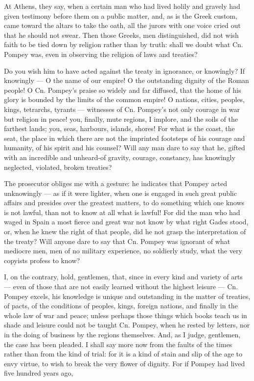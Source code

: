  At Athens, they say, when a certain man who had lived holily and gravely had given testimony before them on a public matter, and, as is the Greek custom, came toward the altars to take the oath, all the jurors with one voice cried out that he should not swear. Then those Greeks, men distinguished, did not wish faith to be tied down by religion rather than by truth: shall we doubt what Cn. Pompey was, even in observing the religion of laws and treaties?

 Do you wish him to have acted against the treaty in ignorance, or knowingly? If knowingly --- O the name of our empire! O the outstanding dignity of the Roman people! O Cn. Pompey's praise so widely and far diffused, that the home of his glory is bounded by the limits of the common empire! O nations, cities, peoples, kings, tetrarchs, tyrants --- witnesses of Cn. Pompey's not only courage in war but religion in peace! you, finally, mute regions, I implore, and the soils of the farthest lands; you, seas, harbours, islands, shores! For what is the coast, the seat, the place in which there are not the imprinted footsteps of his courage and humanity, of his spirit and his counsel? Will any man dare to say that he, gifted with an incredible and unheard-of gravity, courage, constancy, has knowingly neglected, violated, broken treaties?

 The prosecutor obliges me with a gesture: he indicates that Pompey acted unknowingly --- as if it were lighter, when one is engaged in such great public affairs and presides over the greatest matters, to do something which one knows is not lawful, than not to know at all what is lawful! For did the man who had waged in Spain a most fierce and great war not know by what right Gades stood, or, when he knew the right of that people, did he not grasp the interpretation of the treaty? Will anyone dare to say that Cn. Pompey was ignorant of what mediocre men, men of no military experience, no soldierly study, what the very copyists profess to know?

 I, on the contrary, hold, gentlemen, that, since in every kind and variety of arts --- even of those that are not easily learned without the highest leisure --- Cn. Pompey excels, his knowledge is unique and outstanding in the matter of treaties, of pacts, of the conditions of peoples, kings, foreign nations, and finally in the whole law of war and peace; unless perhaps those things which books teach us in shade and leisure could not be taught Cn. Pompey, when he rested by letters, nor in the doing of business by the regions themselves. And, as I judge, gentlemen, the case has been pleaded. I shall say more now from the faults of the times rather than from the kind of trial: for it is a kind of stain and slip of the age to envy virtue, to wish to break the very flower of dignity. For if Pompey had lived five hundred years ago,

